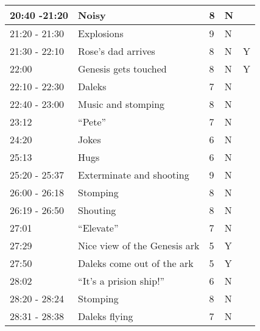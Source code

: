 \begin{longtable}{| p{70pt} | p{130pt} | p{45pt} | p{57pt} | p{60pt}|}
20:40 -21:20           &          Noisy           &          8           &          N&\\\hline       
21:20 - 21:30           &          Explosions           &          9           &          N&\\\hline       
21:30 - 22:10           &          Rose's dad arrives           &          8           &          N&Y\\\hline       
22:00           &          Genesis gets touched           &          8           &          N&Y\\\hline       
22:10 - 22:30           &          Daleks           &          7           &          N&\\\hline       
22:40 - 23:00           &          Music and stomping           &          8           &          N&\\\hline       
23:12           &          ``Pete''           &          7           &          N&\\\hline       
24:20           &          Jokes           &          6           &          N&\\\hline       
25:13           &          Hugs           &          6           &          N&\\\hline       
25:20 - 25:37           &          Exterminate and shooting           &          9           &          N&\\\hline       
26:00 - 26:18           &          Stomping           &          8           &          N&\\\hline       
26:19 - 26:50           &          Shouting           &          8           &          N&\\\hline       
27:01           &          ``Elevate''           &          7           &          N&\\\hline       
27:29           &          Nice view of the Genesis ark           &          5           &          Y&\\\hline       
27:50           &          Daleks come out of the ark           &          5           &          Y&\\\hline       
28:02           &          ``It's a prision ship!''           &          6           &          N&\\\hline       
28:20 - 28:24           &          Stomping           &          8           &          N&\\\hline       
28:31 - 28:38           &          Daleks flying           &          7           &          N&\\\hline       

\end{longtable}
